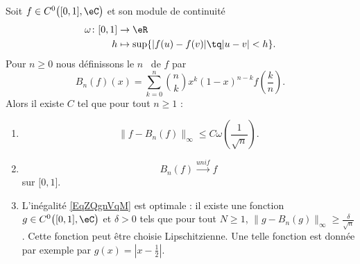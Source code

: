 \begin{theorem}    \label{ThoDJIvrty}
    Soit \( f\in C^0\big( \mathopen[ 0 , 1 \mathclose],\eC \big)\) et son module de continuité
    \begin{equation}
        \begin{aligned}
            \omega\colon \mathopen[ 0 , 1 \mathclose]&\to \eR \\
            h&\mapsto \sup\{ | f(u)-f(v) |\tq | u-v |< h \}. 
        \end{aligned}
    \end{equation}
    Pour \( n\geq 0\) nous définissons le \( n\)\ieme\  de \( f\) par
    \begin{equation}
        B_n(f)(x)=\sum_{k=0}^{n}\binom{ n }{ k }x^k(1-x)^{n-k}f\left( \frac{ k }{ n } \right).
    \end{equation}
    Alors il existe \( C\) tel que pour tout \( n\geq 1\) :
    \begin{enumerate}
        \item
            \begin{equation}        \label{EqZQgnVqM}
                \| f-B_n(f) \|_{\infty}\leq C\omega\left( \frac{1}{ \sqrt{n} } \right).
            \end{equation}
        \item
            \begin{equation}
                B_n(f)\stackrel{unif}{\longrightarrow}f
            \end{equation}
            sur \( \mathopen[ 0 , 1 \mathclose]\).
        \item
            L'inégalité \eqref{EqZQgnVqM} est optimale : il existe une fonction \( g\in C^{0}\big( \mathopen[ 0 , 1 \mathclose],\eC \big)\) et \( \delta>0\) tels que pour tout \( N\geq 1\), \( \| g-B_n(g) \|_{\infty}\geq\frac{ \delta }{ \sqrt{n} }\). Cette fonction peut être choisie Lipschitzienne. Une telle fonction est donnée par exemple par \( g(x)=| x-\frac{ 1 }{2} |\).
    \end{enumerate}
\end{theorem}


